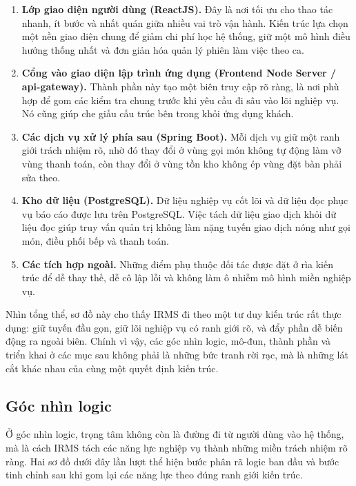 \documentclass[11pt,a4paper]{article}
\begin{document}
\begin{enumerate}
  \item \textbf{Lớp giao diện người dùng (\textsf{ReactJS}).} Đây là nơi tối ưu cho thao tác nhanh, ít bước và nhất quán giữa nhiều vai trò vận hành. Kiến trúc lựa chọn một nền giao diện chung để giảm chi phí học hệ thống, giữ một mô hình điều hướng thống nhất và đơn giản hóa quản lý phiên làm việc theo ca.
  \item \textbf{Cổng vào giao diện lập trình ứng dụng (\textsf{Frontend Node Server} / \textsf{api-gateway}).} Thành phần này tạo một biên truy cập rõ ràng, là nơi phù hợp để gom các kiểm tra chung trước khi yêu cầu đi sâu vào lõi nghiệp vụ. Nó cũng giúp che giấu cấu trúc bên trong khỏi ứng dụng khách.
  \item \textbf{Các dịch vụ xử lý phía sau (\textsf{Spring Boot}).} Mỗi dịch vụ giữ một ranh giới trách nhiệm rõ, nhờ đó thay đổi ở vùng gọi món không tự động làm vỡ vùng thanh toán, còn thay đổi ở vùng tồn kho không ép vùng đặt bàn phải sửa theo.
  \item \textbf{Kho dữ liệu (\textsf{PostgreSQL}).} Dữ liệu nghiệp vụ cốt lõi và dữ liệu đọc phục vụ báo cáo được lưu trên \textsf{PostgreSQL}. Việc tách dữ liệu giao dịch khỏi dữ liệu đọc giúp truy vấn quản trị không làm nặng tuyến giao dịch nóng như gọi món, điều phối bếp và thanh toán.
  \item \textbf{Các tích hợp ngoài.} Những điểm phụ thuộc đối tác được đặt ở rìa kiến trúc để dễ thay thế, dễ cô lập lỗi và không làm ô nhiễm mô hình miền nghiệp vụ.
\end{enumerate}

Nhìn tổng thể, sơ đồ này cho thấy IRMS đi theo một tư duy kiến trúc rất thực dụng: giữ tuyến đầu gọn, giữ lõi nghiệp vụ có ranh giới rõ, và đẩy phần dễ biến động ra ngoài biên. Chính vì vậy, các góc nhìn logic, mô-đun, thành phần và triển khai ở các mục sau không phải là những bức tranh rời rạc, mà là những lát cắt khác nhau của cùng một quyết định kiến trúc.

\subsection{Góc nhìn logic}
Ở góc nhìn logic, trọng tâm không còn là đường đi từ người dùng vào hệ thống, mà là cách IRMS tách các năng lực nghiệp vụ thành những miền trách nhiệm rõ ràng. Hai sơ đồ dưới đây lần lượt thể hiện bước phân rã logic ban đầu và bước tinh chỉnh sau khi gom lại các năng lực theo đúng ranh giới kiến trúc.
\end{document}
